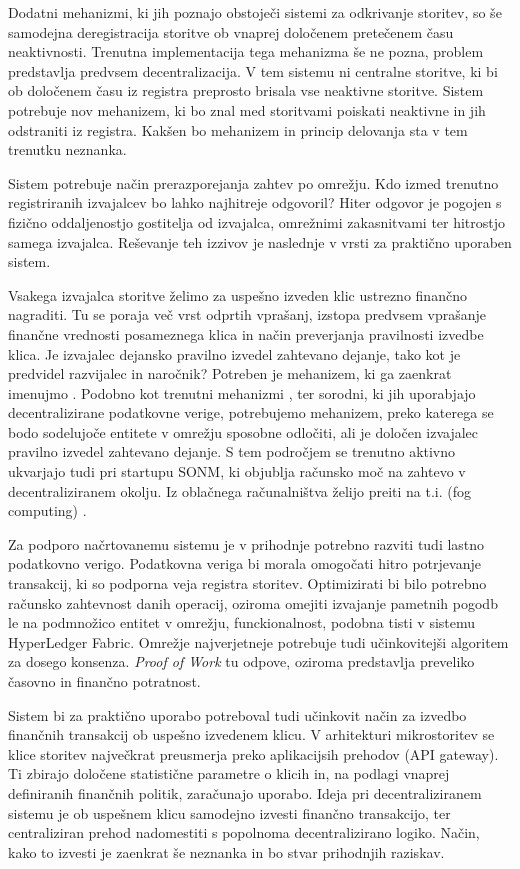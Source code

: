 \documentclass[a4paper, 12pt]{book}
\begin{document}
Dodatni mehanizmi, ki jih poznajo obstoječi sistemi za odkrivanje storitev, so še samodejna deregistracija storitve ob vnaprej določenem pretečenem času neaktivnosti.
Trenutna implementacija tega mehanizma še ne pozna, problem predstavlja predvsem decentralizacija.
V tem sistemu ni centralne storitve, ki bi ob določenem času iz registra preprosto brisala vse neaktivne storitve.
Sistem potrebuje nov mehanizem, ki bo znal med storitvami poiskati neaktivne in jih odstraniti iz registra.
Kakšen bo mehanizem in princip delovanja sta v tem trenutku neznanka.

Sistem potrebuje način prerazporejanja zahtev po omrežju.
Kdo izmed trenutno registriranih izvajalcev bo lahko najhitreje odgovoril?
Hiter odgovor je pogojen s fizično oddaljenostjo gostitelja od izvajalca, omrežnimi zakasnitvami ter hitrostjo samega izvajalca. Reševanje teh izzivov je naslednje v vrsti za praktično uporaben sistem.


Vsakega izvajalca storitve želimo za uspešno izveden klic ustrezno finančno nagraditi. Tu se poraja več vrst odprtih vprašanj, izstopa predvsem vprašanje finančne vrednosti posameznega klica in način preverjanja pravilnosti izvedbe klica.
Je izvajalec dejansko pravilno izvedel zahtevano dejanje, tako kot je predvidel razvijalec in naročnik?
Potreben je mehanizem, ki ga zaenkrat imenujmo .
Podobno kot trenutni mehanizmi ,  ter sorodni, ki jih uporabjajo decentralizirane podatkovne verige, potrebujemo mehanizem, preko katerega se bodo sodelujoče entitete v omrežju sposobne odločiti, ali je določen izvajalec pravilno izvedel zahtevano dejanje.
S tem področjem se trenutno aktivno ukvarjajo tudi pri startupu SONM, ki objublja računsko moč na zahtevo v decentraliziranem okolju. Iz oblačnega računalništva želijo preiti na t.i.  (fog computing) \cite{Sonm}.

Za podporo načrtovanemu sistemu je v prihodnje potrebno razviti tudi lastno podatkovno verigo.
Podatkovna veriga bi morala omogočati hitro potrjevanje transakcij, ki so podporna veja registra storitev.
Optimizirati bi bilo potrebno računsko zahtevnost danih operacij, oziroma omejiti izvajanje pametnih pogodb le na podmnožico entitet v omrežju, funckionalnost, podobna tisti v sistemu HyperLedger Fabric.
Omrežje najverjetneje potrebuje tudi učinkovitejši algoritem za dosego konsenza.
\textit{Proof of Work} tu odpove, oziroma predstavlja preveliko časovno in finančno potratnost.

Sistem bi za praktično uporabo potreboval tudi učinkovit način za izvedbo finančnih transakcij ob uspešno izvedenem klicu.
V arhitekturi mikrostoritev se klice storitev največkrat preusmerja preko aplikacijsih prehodov (API gateway).
Ti zbirajo določene statistične parametre o klicih in, na podlagi vnaprej definiranih finančnih politik, zaračunajo uporabo.
Ideja pri decentraliziranem sistemu je ob uspešnem klicu samodejno izvesti finančno transakcijo, ter centraliziran prehod nadomestiti s popolnoma decentralizirano logiko.
Način, kako to izvesti je zaenkrat še neznanka in bo stvar prihodnjih raziskav.
\end{document}
